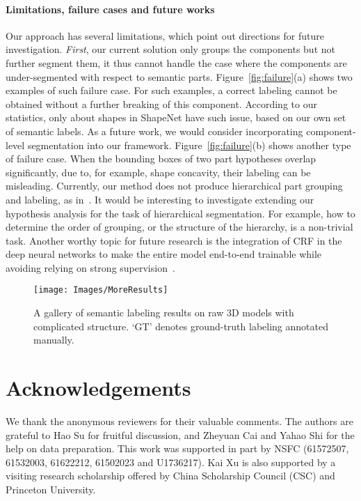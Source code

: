\documentclass[acmtog]{acmart}
\newcommand{\wang}[1]{{\color{black}#1}}
\begin{document}
{\paragraph{\textbf{Limitations, failure cases and future works}}
Our approach has several limitations, which point out directions for future investigation.
\emph{First}, our current solution only groups the components but not further segment them,
it thus cannot handle the case where the components are under-segmented with respect to semantic parts.
Figure~\ref{fig:failure}(a) shows two examples of such failure case.
For such examples, a correct labeling cannot be obtained without a further breaking of this component.
According to our statistics, only about  shapes in ShapeNet have such issue, \wang{based on our own set of semantic labels}.
As a future work, we would consider incorporating component-level segmentation
into our framework.
\wang{Figure~\ref{fig:failure}(b) shows another type of failure case. When the bounding boxes of two part hypotheses overlap significantly, due to, for example, shape concavity, their labeling can be misleading.}
\wang{Currently, our method does not produce hierarchical part grouping and labeling, as in~\cite{Yi_SG17}.
It would be interesting to investigate extending our hypothesis analysis for the task of hierarchical segmentation.
For example, how to determine the order of grouping, or the structure of the hierarchy, is a non-trivial task.}
\wang{Another worthy topic for future research is the integration of CRF in the
deep neural networks to make the entire model end-to-end trainable while avoiding relying on
strong supervision~\cite{Kalogerakis_CVPR17}.}





\begin{figure*}
  \centering
  \texttt{[image: Images/MoreResults]}
  \caption{A gallery of semantic labeling results on raw 3D models with complicated structure. `GT' denotes ground-truth labeling annotated manually.}
  \label{fig:MoreResults}
\end{figure*}
}
 

\section*{Acknowledgements}
We thank the anonymous reviewers for their valuable comments.
The authors are grateful to Hao Su for fruitful discussion, and Zheyuan Cai and Yahao Shi for the help on data preparation.
This work was supported in part by NSFC (61572507, 61532003, 61622212, 61502023 and U1736217).
Kai Xu is also supported by a visiting research scholarship offered by China Scholarship Council (CSC) and Princeton University.



\end{document}
